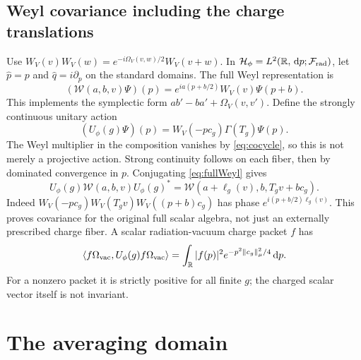 \documentclass[11pt]{article}
\newcommand{\HH}{\mathcal H}
\newcommand{\FF}{\mathcal F}
\newcommand{\dd}{\,\mathrm d}
\newcommand{\vac}{\Omega_{\rm vac}}
\numberwithin{equation}{section}
\begin{document}
\subsection{Weyl covariance including the charge translations}

Use \(W_V(v)W_V(w)=e^{-i\Omega_V(v,w)/2}W_V(v+w)\).
In \(\HH_\phi=L^2(\mathbb R,\dd p;\FF_{\rm rad})\), let
\(\widehat p=p\) and \(\widehat q=i\partial_p\) on the standard
domains. The full Weyl representation is
\begin{equation}
 (\mathcal W(a,b,v)\Psi)(p)
       =e^{ia(p+b/2)}W_V(v)\Psi(p+b).
 \label{eq:fullWeyl}
\end{equation}
This implements the symplectic form
\(a b'-b a'+\Omega_V(v,v')\).
Define the strongly continuous unitary action
\begin{equation}
 (U_\phi(g)\Psi)(p)=W_V(-pc_g)\Gamma(T_g)\Psi(p).
 \label{eq:u}
\end{equation}
The Weyl multiplier in the composition vanishes by
\eqref{eq:cocycle}, so this is not merely a projective action.
Strong continuity follows on each fiber, then by dominated
convergence in \(p\). Conjugating \eqref{eq:fullWeyl} gives
\[
 U_\phi(g)\mathcal W(a,b,v)U_\phi(g)^*
   =\mathcal W(a+\ell_g(v),b,T_gv+b c_g).
\]
Indeed \(W_V(-pc_g)W_V(T_gv)W_V((p+b)c_g)\) has phase
\(e^{i(p+b/2)\ell_g(v)}\). This proves covariance for the
original full scalar algebra, not just an externally prescribed
charge fiber. A scalar radiation-vacuum charge packet \(f\) has
\begin{equation}
 \langle f\vac,U_\phi(g)f\vac\rangle
    =\int_{\mathbb R}|f(p)|^2
      e^{-p^2\|c_g\|_\mu^2/4}\dd p .
 \label{eq:scalar-vac}
\end{equation}
For a nonzero packet it is strictly positive for all finite
\(g\); the charged scalar vector itself is not invariant.

\section{The averaging domain}
\end{document}

